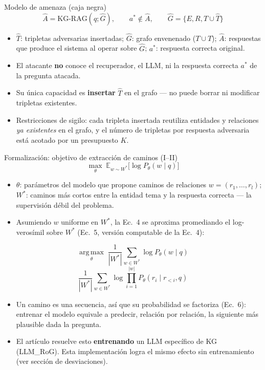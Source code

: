 \documentclass[aspectratio=169]{beamer}
\begin{document}
\begin{frame}{Modelo de amenaza (caja negra)}
  \[ \hat{A} = \text{KG-RAG}(q; \hat{G}), \qquad a^{*} \notin \hat{A}, \qquad
     \hat{G} = \{E, R, T \cup \hat{T}\} \tag{3} \]
  \begin{itemize}
    \item $\hat{T}$: tripletas adversarias insertadas; $\hat{G}$: grafo
      envenenado ($T \cup \hat{T}$); $\hat{A}$: respuestas que produce el
      sistema al operar sobre $\hat{G}$; $a^{*}$: respuesta correcta original.
    \item El atacante \textbf{no} conoce el recuperador, el LLM, ni la respuesta
      correcta $a^{*}$ de la pregunta atacada.
    \item Su única capacidad es \textbf{insertar} $\hat{T}$ en el grafo --- no
      puede borrar ni modificar tripletas existentes.
    \item Restricciones de sigilo: cada tripleta insertada reutiliza entidades y
      relaciones \emph{ya existentes} en el grafo, y el número de tripletas por
      respuesta adversaria está acotado por un presupuesto $K$.
  \end{itemize}
\end{frame}

\begin{frame}{Formalización: objetivo de extracción de caminos (I--II)}
  \footnotesize
  \setlength{\abovedisplayskip}{3pt}
  \setlength{\belowdisplayskip}{3pt}
  \[ \max_\theta \; \mathbb{E}_{w \sim W^{*}}\big[\log P_\theta(w \mid q)\big] \tag{4} \]
  \begin{itemize}
    \item $\theta$: parámetros del modelo que propone caminos de relaciones
      $w = (r_1, \dots, r_l)$; $W^{*}$: caminos más cortos entre la entidad
      tema y la respuesta correcta --- la supervisión débil del problema.
    \item Asumiendo $w$ uniforme en $W^{*}$, la Ec.~4 se aproxima promediando
      el log-verosímil sobre $W^{*}$ (Ec.~5, versión computable de la Ec.~4):
  \end{itemize}
  \[ \operatorname*{arg\,max}_\theta \; \frac{1}{|W^{*}|} \sum_{w \in W^{*}} \log P_\theta(w \mid q) \tag{5} \]
  \[ \frac{1}{|W^{*}|} \sum_{w \in W^{*}} \log \prod_{i=1}^{|w|} P_\theta(r_i \mid r_{<i}, q) \tag{6} \]
  \begin{itemize}
    \item Un camino es una secuencia, así que su probabilidad se factoriza
      (Ec.~6): entrenar el modelo equivale a predecir, relación por relación,
      la siguiente más plausible dada la pregunta.
    \item El artículo resuelve esto \textbf{entrenando} un LLM específico de KG
      (LLM\_RoG). Esta implementación logra el mismo efecto sin entrenamiento
      (ver sección de desviaciones).
  \end{itemize}
\end{frame}
\end{document}
